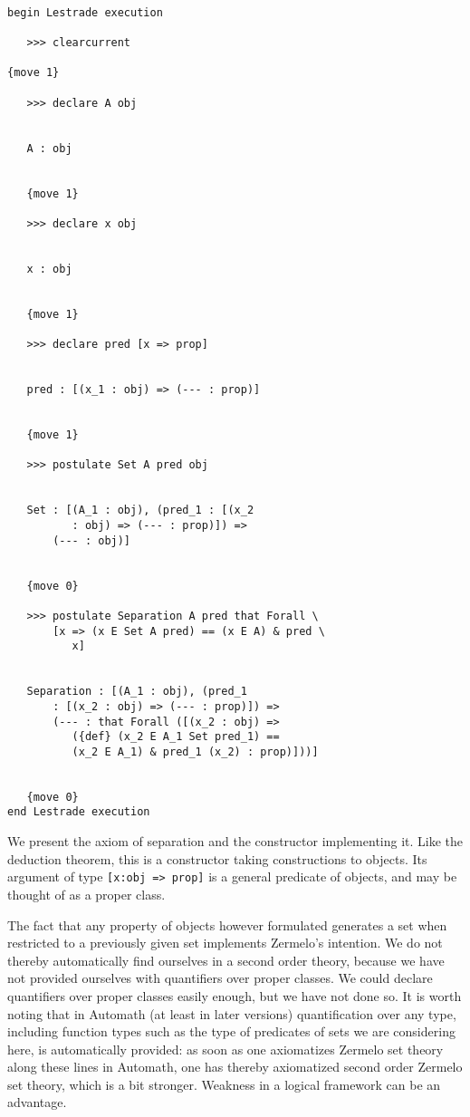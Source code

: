 \documentclass[12pt]{article}
\begin{document}
\begin{verbatim}

begin Lestrade execution

   >>> clearcurrent

{move 1}

   >>> declare A obj


   A : obj


   {move 1}

   >>> declare x obj


   x : obj


   {move 1}

   >>> declare pred [x => prop]


   pred : [(x_1 : obj) => (--- : prop)]


   {move 1}

   >>> postulate Set A pred obj


   Set : [(A_1 : obj), (pred_1 : [(x_2 
          : obj) => (--- : prop)]) => 
       (--- : obj)]


   {move 0}

   >>> postulate Separation A pred that Forall \
       [x => (x E Set A pred) == (x E A) & pred \
          x]


   Separation : [(A_1 : obj), (pred_1 
       : [(x_2 : obj) => (--- : prop)]) => 
       (--- : that Forall ([(x_2 : obj) => 
          ({def} (x_2 E A_1 Set pred_1) == 
          (x_2 E A_1) & pred_1 (x_2) : prop)]))]


   {move 0}
end Lestrade execution
\end{verbatim}

We present the axiom of separation and the constructor implementing it.  Like the deduction theorem, this is a constructor taking constructions to objects.
Its argument of type {\tt [x:obj => prop]} is a general predicate of objects, and may be thought of as a proper class.

The fact that any property of objects however formulated generates a set when restricted to a previously given set implements Zermelo's intention.  We do not thereby automatically find ourselves in a second order theory, because we have not provided ourselves with quantifiers over proper classes.  We could declare quantifiers over proper classes easily enough, but we have not done so.  It is worth noting that in Automath (at least in later versions) quantification over any type, including function types such as the type of predicates of sets we are considering here, is automatically provided:  as soon as one axiomatizes Zermelo set theory along these lines in Automath, one has thereby axiomatized second order Zermelo set theory, which is a bit stronger.  Weakness in a logical framework can be an advantage.
\end{document}
